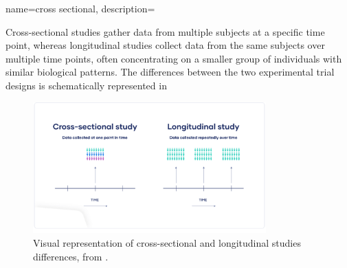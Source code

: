 {name=cross sectional, 
description={Cross-sectional studies gather data from multiple subjects at a specific time point,
 whereas longitudinal studies collect data from the same subjects over multiple time points, 
 often concentrating on a smaller group of individuals with similar biological patterns.  
 The differences between the two experimental trial designs is schematically represented in  
 \begin{figure}[b]
\centering
\includegraphics[width=0.8\textwidth]{figures/sjogren/sectional-vs-long.png}
\caption{Visual representation of cross-sectional and longitudinal studies differences, from \autocite{louis23}.}
\label{fig:cross-study}
\end{figure}
 }}
 






